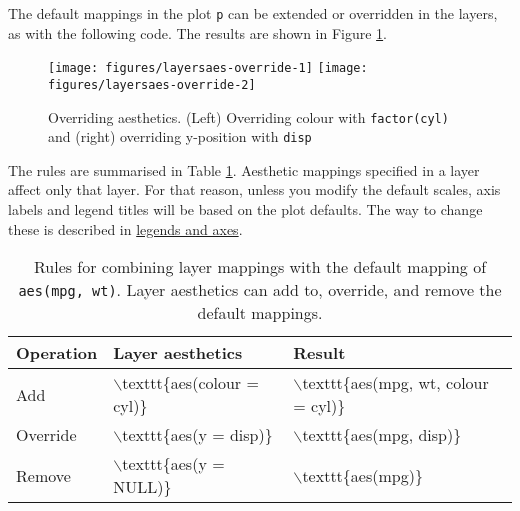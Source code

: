The default mappings in the plot \texttt{p} can be extended or
overridden in the layers, as with the following code.
 The results are shown in Figure
\ref{fig:aes-override}.

\begin{Shaded}
\begin{Highlighting}[]
\StringTok{ }\NormalTok{(}\NormalTok{(} 
\StringTok{ }\NormalTok{(}\NormalTok{(} 
\end{Highlighting}
\end{Shaded}

\begin{figure}

{\centering \texttt{[image: figures/layersaes-override-1]} \texttt{[image: figures/layersaes-override-2]} 

}

\caption{Overriding aesthetics. (Left) Overriding colour with \texttt{factor(cyl)} and (right) overriding y-position with \texttt{disp}\label{fig:aes-override}}
\end{figure}

The rules are summarised in Table \ref{tbl:aes-override}. Aesthetic
mappings specified in a layer affect only that layer. For that reason,
unless you modify the default scales, axis labels and legend titles will
be based on the plot defaults. The way to change these is described in
\hyperref[sec:guides]{legends and axes}.

\begin{table}[ht]
\centering
\begin{tabular}{lll}
  \hline
Operation & Layer aesthetics & Result \\ 
  \hline
Add & $\backslash$texttt\{aes(colour = cyl)\} & $\backslash$texttt\{aes(mpg, wt, colour = cyl)\} \\ 
  Override & $\backslash$texttt\{aes(y = disp)\} & $\backslash$texttt\{aes(mpg, disp)\} \\ 
  Remove & $\backslash$texttt\{aes(y = NULL)\} & $\backslash$texttt\{aes(mpg)\} \\ 
   \hline
\end{tabular}
\caption{Rules for combining layer mappings with the default mapping of \texttt{aes(mpg, wt)}.  Layer aesthetics can add to, override, and remove the default mappings.} 
\label{tbl:aes-override}
\end{table}

